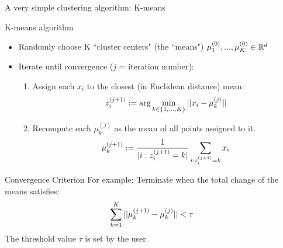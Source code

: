\documentclass[10pt]{beamer}
\newcommand{\assign}{z} %
\begin{document}
%
%
%



\begin{frame}{A very simple clustering algorithm: K-means}
\scriptsize
\begin{sblock}{K-means algorithm}
\begin{itemize}

\item Randomly choose K ``cluster centers" (the ``means") $\mu_1^{(0)}, ..., \mu_K^{(0)} \in \mathbb{R}^d$
\item Iterate until convergence ($j$ = iteration number):
	\begin{enumerate}
	\scriptsize
	\item Assign each $x_i$ to the closest (in Euclidean distance) mean:
	\[ \assign_i^{(j+1)} := \arg\min_{k \in \set{1,...,K}} ||x_i - \mu_k^{(j)} || \]
	\item Recompute each $\mu_k^{(j)}$ as the mean of all points assigned to it.
	\[ \mu_k^{(j+1)} := \df{1}{|i : \assign_i^{(j+1)} = k |}  \ds\sum_{i : \assign_i^{(j+1)} = k} x_i\]
	\end{enumerate}
\end{itemize}

\end{sblock}

\begin{sblock}{Convergence Criterion}
For example: Terminate when the total change of the means satisfies:
\[  \displaystyle\sum_{k=1}^K || \mu_k^{(j+1)} - \mu_k^{(j)} || < \tau \]
The threshold value $\tau$ is set by the user.
\end{sblock}

\end{frame}
\end{document}
